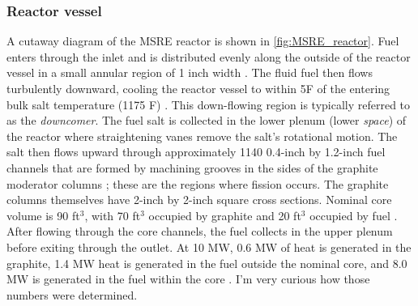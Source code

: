 \documentclass{article}
\let\Oldsubsubsection\subsubsection
\renewcommand{\subsubsection}{\FloatBarrier\Oldsubsubsection}
\begin{document}
\subsubsection{Reactor vessel}
\label{sec:reactor}

A cutaway diagram of the \gls{MSRE} reactor is shown in
\cref{fig:MSRE_reactor}. Fuel enters through the inlet and is distributed evenly
along the outside of the reactor vessel in a small annular region of 1 inch
width \cite{robertson_msre_1965}. The fluid fuel then flows turbulently
downward, cooling the reactor vessel to within 5\textdegree F of the entering
bulk salt temperature (1175 \textdegree F) \cite{robertson_msre_1965}. This
down-flowing region is typically referred to as the \textit{downcomer}. The fuel
salt is collected in the lower plenum (lower \textit{space}) of the reactor
where straightening vanes remove the salt's rotational motion. The salt then
flows upward through approximately 1140 0.4-inch by 1.2-inch fuel channels that
are formed by machining grooves in the sides of the graphite moderator columns
\cite{robertson_msre_1965}; these are the regions where fission occurs.  The
graphite columns themselves have 2-inch by 2-inch square cross sections.
Nominal core volume is 90 ft$^3$, with 70 ft$^3$ occupied by graphite and 20
ft$^3$ occupied by fuel \cite{robertson_msre_1965}.  After flowing through the
core channels, the fuel collects in the upper plenum before exiting through the
outlet. At 10 MW, 0.6 MW of heat is generated in the graphite, 1.4 MW heat is
generated in the fuel outside the nominal core, and 8.0 MW is generated in the
fuel within the core \cite{robertson_msre_1965}. I'm very curious how those
numbers were determined.
\end{document}
